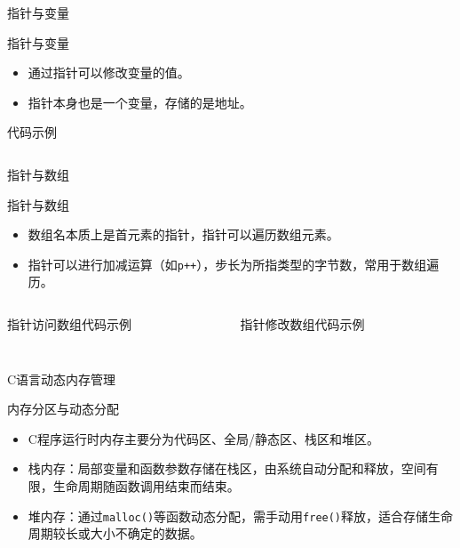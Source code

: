 \documentclass[UTF8,aspectratio=169]{beamer}
\begin{document}
\begin{frame}{指针与变量}
    \begin{ytublock}{指针与变量}
        \begin{itemize}
            \item 通过指针可以修改变量的值。
            \item 指针本身也是一个变量，存储的是地址。
        \end{itemize}
    \end{ytublock}
    \begin{ytublock}{代码示例}
        \inputminted[firstline=9,lastline=20]{cpp}{code/c_pointer_example.c}
    \end{ytublock}
\end{frame}

\begin{frame}{指针与数组}
    \begin{ytublock}{指针与数组}
        \begin{itemize}
            \item 数组名本质上是首元素的指针，指针可以遍历数组元素。
            \item 指针可以进行加减运算（如\texttt{p++}），步长为所指类型的字节数，常用于数组遍历。
        \end{itemize}
    \end{ytublock}
    \begin{columns}
        \begin{column}{0.48\textwidth}
    \begin{ytublock}{指针访问数组代码示例}
        \inputminted[firstline=22,lastline=30]{cpp}{code/c_pointer_example.c}
    \end{ytublock}
    \end{column}
    \begin{column}{0.48\textwidth}
        \begin{ytublock}{指针修改数组代码示例}
            \inputminted[firstline=32,lastline=38]{cpp}{code/c_pointer_example.c}
        \end{ytublock}
    \end{column}
    \end{columns}
\end{frame}

\begin{frame}{C语言动态内存管理}
    \begin{ytublock}{内存分区与动态分配}
        \begin{itemize}
            \item C程序运行时内存主要分为代码区、全局/静态区、栈区和堆区。
            \item 栈内存：局部变量和函数参数存储在栈区，由系统自动分配和释放，空间有限，生命周期随函数调用结束而结束。
            \item 堆内存：通过\texttt{malloc()}等函数动态分配，需手动用\texttt{free()}释放，适合存储生命周期较长或大小不确定的数据。
        \end{itemize}
        \inputminted[firstline=8,lastline=12]{cpp}{code/c_pointer_memory_example.c}
    \end{ytublock}
\end{frame}
\end{document}
